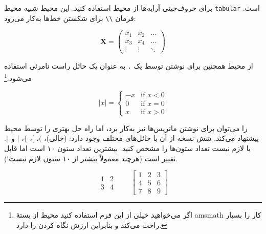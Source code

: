 برای حروف‌چینی آرایه‌ها از محیط  استفاده کنید. این محیط شبیه محیط  \texttt{tabular} است. فرمان \verb|\\| برای شکستن خط‌ها به‌کار می‌رود:
\begin{example}
\begin{equation*}
 \mathbf{X} = \left( 
  \begin{array}{ccc}
   x_1 & x_2 & \ldots \\
   x_3 & x_4 & \ldots \\
   \vdots & \vdots & \ddots
  \end{array} \right)
\end{equation*}
\end{example}


از محیط  همچنین برای نوشتن 
توسط یک \verb|.| به عنوان یک حائل راست نامرئی استفاده می‌شود:\footnote{اگر می‌خواهید خیلی از این فرم استفاده کنید محیط  از بستۀ 
  \textsf{amsmath} کار را بسیار راحت می‌کند و بنابراین ارزش نگاه کردن را دارد.}  
\begin{example}
\begin{equation*}
|x| = \left\{
 \begin{array}{rl}
  -x & \text{if } x < 0\\
   0 & \text{if } x = 0\\
   x & \text{if } x > 0
 \end{array} \right.
\end{equation*}
\end{example}



 را می‌توان برای نوشتن ماتریس‌ها  نیز به‌کار برد، اما 
 راه‌ حل بهتری را توسط محیط  پیشنهاد می‌کند. شش نسخه از آن با حائل‌های مختلف وجود دارد: 
(خالی)،  $($،  $[$،  $\{$،  $\vert$ و
 $\Vert$. با  لازم نیست تعداد ستون‌ها را مشخص کنید. بیشترین تعداد ستون ۱۰ 
است اما قابل تغییر است 
(هرچند معمولاً بیشتر از ۱۰ ستون لازم نیست!).
\begin{example}
\begin{equation*}
 \begin{matrix} 
   1 & 2 \\
   3 & 4 
 \end{matrix} \qquad
 \begin{bmatrix} 
   1 & 2 & 3 \\
   4 & 5 & 6 \\ 
   7 & 8 & 9
 \end{bmatrix}
\end{equation*}
\end{example}


